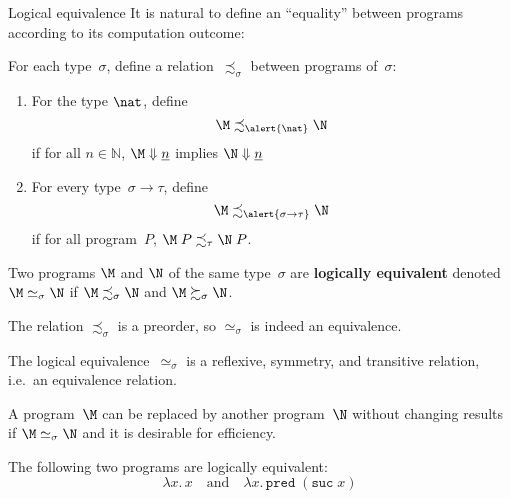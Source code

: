 \begin{frame}{Logical equivalence}
  It is natural to define an ``equality'' between programs according to its
  computation outcome:
  \begin{definition}
    For each type~$\sigma$, define a relation~$\precsim_\sigma$ between
    programs of~$\sigma$:
    \begin{enumerate}
      \item For the type $\nat$, define
        \[
          \M \precsim_{\alert{\nat}} \N
        \]
        if for all $n \in \mathbb{N}$, 
          $\M \Downarrow \underline{n}$ implies $\N \Downarrow \underline{n}$
      \item For every type~$\sigma \to \tau$, define
        \[
          \M \precsim_{\alert{\sigma \to\tau}} \N
        \]
          if for all program~$P$,
            $\M\;P \precsim_{\tau} \N\;P$.
    \end{enumerate}
  \end{definition}
    Two programs $\M$ and $\N$ of the same type~$\sigma$ are \textbf{logically
      equivalent} denoted~$\M\simeq_\sigma\N$ if $\M \precsim_\sigma \N$ and
    $\M \succsim_\sigma \N$. 

\end{frame}

\begin{frame}
  The relation $\precsim_\sigma$ is a preorder, so
  $\simeq_\sigma$ is indeed an equivalence.   \begin{proposition}
    The logical equivalence~$\simeq_\sigma$ is a reflexive, symmetry, and transitive
    relation, i.e.\ an equivalence relation.
  \end{proposition}
  A program~$\M$ can be replaced by another program~$\N$ without changing
  results if $\M \simeq_\sigma \N$ and it is desirable for efficiency.
    \begin{example}
      The following two programs are logically equivalent:
      \[
        \lambda x.\, x
        \quad\text{and}\quad
        \lambda x.\, \mathtt{pred}\; (\mathtt{suc}\; x)
      \]
    \end{example}
\end{frame}

